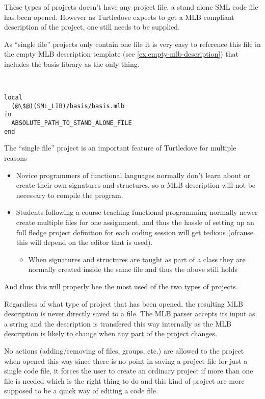 These types of projects doesn't have any project file, a stand alone SML code
file has been opened. However as Turtledove expects to get a MLB compliant
description of the project, one still needs to be supplied.

As ``single file'' projects only contain one file it is very easy to reference
this file in the empty MLB description template (see
\ref{ex:empty-mlb-description}) that includes the basis library as the only
thing.

\begin{example}\
\begin{lstlisting}
local
  (@\$@)(SML_LIB)/basis/basis.mlb
in
  ABSOLUTE_PATH_TO_STAND_ALONE_FILE
end
\end{lstlisting}  
\end{example}


The ``single file'' project is an important feature of Turtledove for multiple
reasons

\begin{itemize}
\item Novice programmers of functional languages normally don't learn about or
  create their own signatures and structures, so a MLB description will not be
  necessary to compile the program.
  
\item Students following a course teaching functional programming normally newer
  create multiple files for one assignment, and thus the hassle of setting up an
  full fledge project definition for each coding session will get tedious
  (ofcause this will depend on the editor that is used).
  
  \begin{itemize}
  \item When signatures and structures are taught as part of a class they are
    normally created inside the same file and thus the above still holds
  \end{itemize}
\end{itemize}

And thus this will properly bee the most used of the two types of projects.

Regardless of what type of project that has been opened, the resulting MLB
description is never directly saved to a file. The MLB parser accepts its input
as a string and the description is transfered this way internally as the MLB
description is likely to change when any part of the project changes.

No actions (adding/removing of files, groups, etc.) are allowed to the project
when opened this way since there is no point in saving a project file for just a
single code file, it forces the user to create an ordinary project if more
than one file is needed which is the right thing to do and this kind of project
are more supposed to be a quick way of editing a code file.
